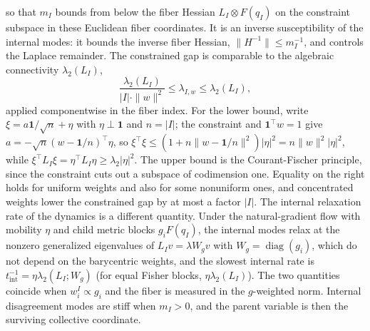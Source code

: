 \documentclass[11pt]{article}
\begin{document}
so that $m_I$ bounds from below the fiber Hessian $L_I\otimes F(q_I)$ on the constraint subspace in these Euclidean fiber coordinates. It is an inverse susceptibility of the internal modes: it bounds the inverse fiber Hessian, $\|H^{-1}\|\le m_I^{-1}$, and controls the Laplace remainder. The constrained gap is comparable to the algebraic connectivity $\lambda_2(L_I)$,
\begin{equation}
\frac{\lambda_2(L_I)}{|I|\cdot\|w\|^2}\le\lambda_{I,w}\le\lambda_2(L_I),
\label{eq:rg_gap_interlacing}
\end{equation}
applied componentwise in the fiber index. For the lower bound, write $\xi=a\mathbf{1}/\sqrt{n}+\eta$ with $\eta\perp\mathbf{1}$ and $n=|I|$; the constraint and $\mathbf{1}^\top w=1$ give $a=-\sqrt{n}(w-\mathbf{1}/n)^\top\eta$, so $\xi^\top\xi\le(1+n\|w-\mathbf{1}/n\|^2)|\eta|^2=n\|w\|^2|\eta|^2$, while $\xi^\top L_I\xi=\eta^\top L_I\eta\ge\lambda_2|\eta|^2$. The upper bound is the Courant-Fischer principle, since the constraint cuts out a subspace of codimension one. Equality on the right holds for uniform weights and also for some nonuniform ones, and concentrated weights lower the constrained gap by at most a factor $|I|$. The internal relaxation rate of the dynamics is a different quantity. Under the natural-gradient flow with mobility $\eta$ and child metric blocks $g_iF(q_I)$, the internal modes relax at the nonzero generalized eigenvalues of $L_Iv=\lambda W_gv$ with $W_g=\operatorname{diag}(g_i)$, which do not depend on the barycentric weights, and the slowest internal rate is $t_{\mathrm{int}}^{-1}=\eta\lambda_2(L_I;W_g)$ (for equal Fisher blocks, $\eta\lambda_2(L_I)$). The two quantities coincide when $w_i^I\propto g_i$ and the fiber is measured in the $g$-weighted norm. Internal disagreement modes are stiff when $m_I > 0$, and the parent variable is then the surviving collective coordinate.
\end{document}
